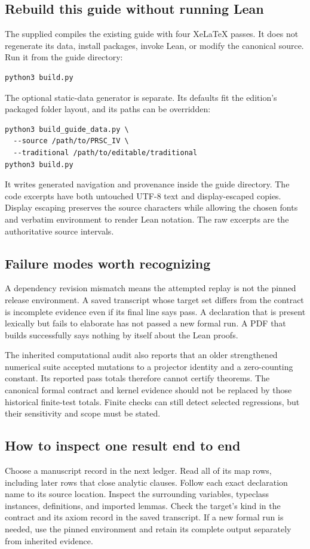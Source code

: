 \subsection{Rebuild this guide without running Lean}
The supplied  compiles the existing guide with four XeLaTeX passes. It does not regenerate its data, install packages, invoke Lean, or modify the canonical source. Run it from the guide directory:
\begin{Verbatim}[fontsize=\small,breaklines=true,breakanywhere=true]
python3 build.py
\end{Verbatim}
The optional static-data generator is separate. Its defaults fit the edition's packaged folder layout, and its paths can be overridden:
\begin{Verbatim}[fontsize=\small,breaklines=true,breakanywhere=true]
python3 build_guide_data.py \
  --source /path/to/PRSC_IV \
  --traditional /path/to/editable/traditional
python3 build.py
\end{Verbatim}
It writes generated navigation and provenance inside the guide directory. The code excerpts have both untouched UTF-8 text and display-escaped copies. Display escaping preserves the source characters while allowing the chosen fonts and verbatim environment to render Lean notation. The raw excerpts are the authoritative source intervals.

\subsection{Failure modes worth recognizing}
A dependency revision mismatch means the attempted replay is not the pinned release environment. A saved transcript whose target set differs from the contract is incomplete evidence even if its final line says pass. A declaration that is present lexically but fails to elaborate has not passed a new formal run. A PDF that builds successfully says nothing by itself about the Lean proofs.

The inherited computational audit also reports that an older strengthened numerical suite accepted mutations to a projector identity and a zero-counting constant. Its reported pass totals therefore cannot certify theorems. The canonical formal contract and kernel evidence should not be replaced by those historical finite-test totals. Finite checks can still detect selected regressions, but their sensitivity and scope must be stated.

\subsection{How to inspect one result end to end}
Choose a manuscript record in the next ledger. Read all of its map rows, including later rows that close analytic clauses. Follow each exact declaration name to its source location. Inspect the surrounding variables, typeclass instances, definitions, and imported lemmas. Check the target's kind in the contract and its axiom record in the saved transcript. If a new formal run is needed, use the pinned environment and retain its complete output separately from inherited evidence.

